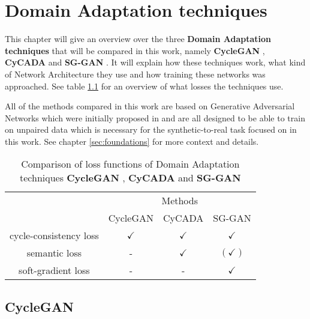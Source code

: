 \chapter{Domain Adaptation techniques}
\label{sec:techniques}

This chapter will give an overview over the three \textbf{Domain Adaptation techniques} that will be compared in this work, namely \textbf{CycleGAN} \cite{DBLP:journals/corr/ZhuPIE17}, \textbf{CyCADA} \cite{DBLP:journals/corr/abs-1711-03213} and \textbf{SG-GAN} \cite{DBLP:journals/corr/abs-1801-01726}. It will explain how these techniques work, what kind of Network Architecture they use and how training these networks was approached. See table \ref{table:DA_comparison} for an overview of what losses the techniques use.

All of the methods compared in this work are based on Generative Adversarial Networks which were initially proposed in \cite{NIPS2014_5423} and are all designed to be able to train on unpaired data which is necessary for the synthetic-to-real task focused on in this work. See chapter \ref{sec:foundations} for more context and details.

\begin{table}
	\centering
	\begin{tabular}{|c|c|c|c|}
		\multicolumn{1}{c}{} & \multicolumn{3}{c}{Methods}\\
		\cline{2-4}
		\multicolumn{1}{c|}{} & CycleGAN & CyCADA & SG-GAN\\
		\hline
		cycle-consistency loss & $\checkmark$ & $\checkmark$ & $\checkmark$\\
		\hline
		semantic loss & - & $\checkmark$ & $(\checkmark)$\\
		\hline 
		soft-gradient loss & - & - & $\checkmark$\\
		\hline
	\end{tabular} 
	\caption{Comparison of loss functions of Domain Adaptation techniques \textbf{CycleGAN} \cite{DBLP:journals/corr/ZhuPIE17}, \textbf{CyCADA} \cite{DBLP:journals/corr/abs-1711-03213} and \textbf{SG-GAN} \cite{DBLP:journals/corr/abs-1801-01726}}
	\label{table:DA_comparison}
\end{table}

\section{CycleGAN} 


